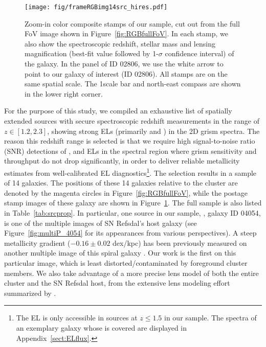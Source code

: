 \begin{figure}
    \centering
    \texttt{[image: fig/frameRGBimg14src\_hires.pdf]}
    \caption[Zoom-in color composite stamps of our \mg sample.]{Zoom-in color composite stamps of our \mg sample, cut out from the full FoV
    image shown in Figure~\ref{fig:RGBfullFoV}. In each stamp, we also show the spectroscopic
    redshift, stellar mass and lensing magnification (best-fit value followed by 1-$\sigma$
    confidence interval) of the galaxy.
    In the panel of ID 02806, we use the white arrow to point to our galaxy of interest (ID
    02806). All stamps are on the same spatial scale. The 1\arcsec scale bar and north-east
    compass are shown in the lower right corner.}
    \label{fig:RGBstamps}
\end{figure}

For the purpose of this study, we compiled an exhaustive list of spatially extended sources with secure spectroscopic redshift
measurements in the range of $z\in[1.2, 2.3]$, showing strong ELs (primarily \OIII and \Hb) in the 2D grism spectra.
The reason this redshift range is selected is that we require high signal-to-noise ratio (SNR) detections of \OIII, \Hb and \OII 
ELs in the spectral region where grism sensitivity and throughput do not drop significantly, in order to deliver reliable 
metallicity estimates from well-calibrated EL diagnostics\footnote{The \Ha EL is only accessible in sources at $z\leq1.5$ in our 
sample. The \glass spectra of an exemplary galaxy whose \Ha is covered are displayed in Appendix~\ref{sect:ELflux}.}.
The selection results in a sample of 14 galaxies. The positions of these 14 galaxies relative to the cluster are denoted by the 
magenta circles in Figure~\ref{fig:RGBfullFoV}, while the postage stamp images of these galaxy are shown in 
Figure~\ref{fig:RGBstamps}.
The full sample is also listed in Table~\ref{tab:srcprop}.
In particular, one source in our sample, \ie, galaxy ID 04054, is one of the multiple images of SN Refsdal's host
galaxy (see Figure~\ref{fig:multiP_4054} for its appearances from
various perspectives). A steep metallicity gradient ($-0.16\pm0.02$
dex/kpc) has been previously measured on another multiple image of
this spiral galaxy \citep{Yuan:2011hj}. Our work is the first
\mgm on this particular image, which is least distorted/contaminated
by foreground cluster members. We also take advantage of a more
precise lens model of both the entire cluster and the SN Refsdal host,
from the extensive lens modeling effort summarized by \citet{2015arXiv151005750T}.

